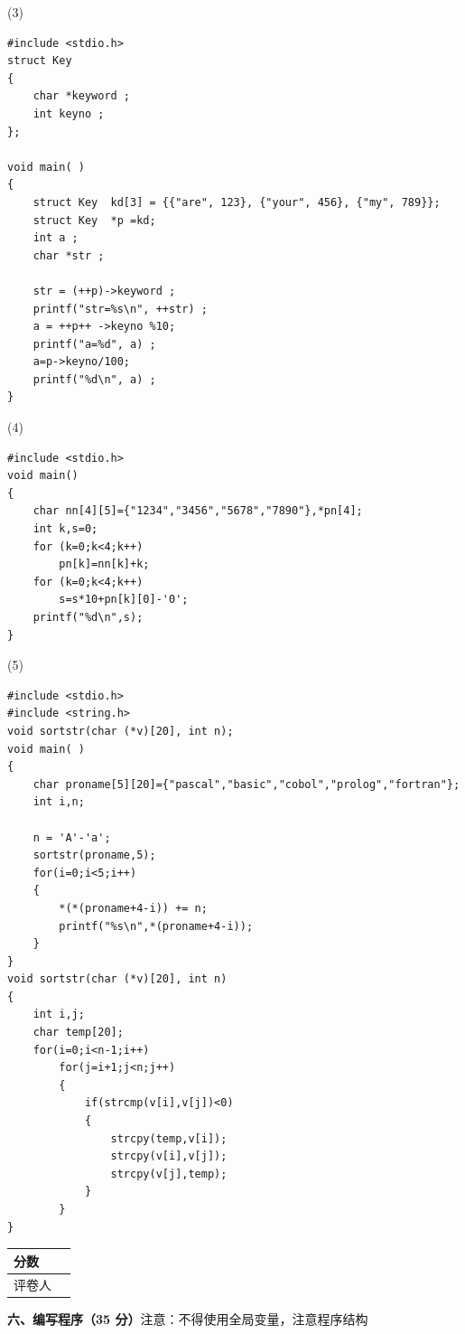 \documentclass[a4paper,11pt]{ctexart}
\newcommand{\secbox}[2]{%
  \noindent\begin{tabular}{|>{\centering\arraybackslash}m{1.5cm}|>{\centering\arraybackslash}m{1.5cm}|}
    \hline
    分数 & \\ \hline
    评卷人 & \\ \hline
  \end{tabular}\hspace{0.8em}%
  \begin{minipage}[c]{\dimexpr\textwidth-4.2cm\relax}
    \textbf{#1}#2
  \end{minipage}\par\vspace{0.5em}%
}
\begin{document}
\enlargethispage{1\baselineskip}
\vspace{4pt}
\noindent (3)
\begin{lstlisting}
#include <stdio.h>
struct Key
{
    char *keyword ;
    int keyno ;
};

void main( )
{
    struct Key  kd[3] = {{"are", 123}, {"your", 456}, {"my", 789}};
    struct Key  *p =kd;
    int a ;
    char *str ;

    str = (++p)->keyword ;
    printf("str=%s\n", ++str) ;
    a = ++p++ ->keyno %10;
    printf("a=%d", a) ;
    a=p->keyno/100;
    printf("%d\n", a) ;
}
\end{lstlisting}

\vspace{4pt}
\noindent (4)
\begin{lstlisting}
#include <stdio.h>
void main()
{
    char nn[4][5]={"1234","3456","5678","7890"},*pn[4];
    int k,s=0;
    for (k=0;k<4;k++)
        pn[k]=nn[k]+k;
    for (k=0;k<4;k++)
        s=s*10+pn[k][0]-'0';
    printf("%d\n",s);
}
\end{lstlisting}

\vspace{4pt}
\noindent (5)
\begin{lstlisting}
#include <stdio.h>
#include <string.h>
void sortstr(char (*v)[20], int n);
void main( )
{
    char proname[5][20]={"pascal","basic","cobol","prolog","fortran"};
    int i,n;

    n = 'A'-'a';
    sortstr(proname,5);
    for(i=0;i<5;i++)
    {
        *(*(proname+4-i)) += n;
        printf("%s\n",*(proname+4-i));
    }
}
void sortstr(char (*v)[20], int n)
{
    int i,j;
    char temp[20];
    for(i=0;i<n-1;i++)
        for(j=i+1;j<n;j++)
        {
            if(strcmp(v[i],v[j])<0)
            {
                strcpy(temp,v[i]);
                strcpy(v[i],v[j]);
                strcpy(v[j],temp);
            }
        }
}
\end{lstlisting}

\vspace{8pt}

\secbox{六、编写程序（35 分）}{注意：不得使用全局变量，注意程序结构}
\end{document}
